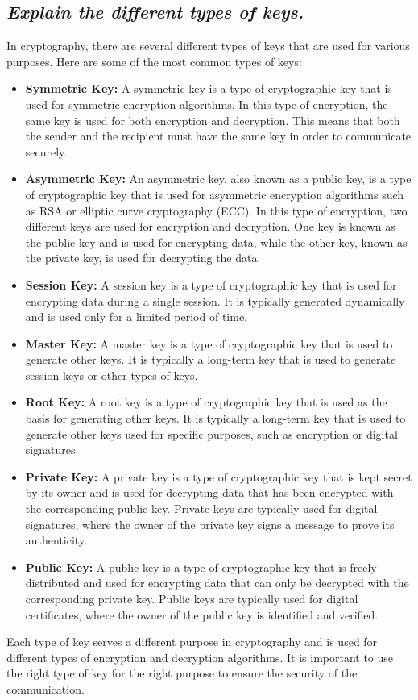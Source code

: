\documentclass{article}
\begin{document}
\subsection{\textit{Explain the different types of keys.}}
In cryptography, there are several different types of keys that are used for various purposes. Here are some of the most common types of keys:
\begin{itemize}
    \item \textbf{Symmetric Key:} A symmetric key is a type of cryptographic key that is used for symmetric encryption algorithms. In this type of encryption, the same key is used for both encryption and decryption. This means that both the sender and the recipient must have the same key in order to communicate securely.
    \item \textbf{Asymmetric Key:} An asymmetric key, also known as a public key, is a type of cryptographic key that is used for asymmetric encryption algorithms such as RSA or elliptic curve cryptography (ECC). In this type of encryption, two different keys are used for encryption and decryption. One key is known as the public key and is used for encrypting data, while the other key, known as the private key, is used for decrypting the data.
    \item \textbf{Session Key:} A session key is a type of cryptographic key that is used for encrypting data during a single session. It is typically generated dynamically and is used only for a limited period of time.
    \item \textbf{Master Key:} A master key is a type of cryptographic key that is used to generate other keys. It is typically a long-term key that is used to generate session keys or other types of keys.
    \item \textbf{Root Key:} A root key is a type of cryptographic key that is used as the basis for generating other keys. It is typically a long-term key that is used to generate other keys used for specific purposes, such as encryption or digital signatures.
    \item \textbf{Private Key:} A private key is a type of cryptographic key that is kept secret by its owner and is used for decrypting data that has been encrypted with the corresponding public key. Private keys are typically used for digital signatures, where the owner of the private key signs a message to prove its authenticity.
    \item \textbf{Public Key:} A public key is a type of cryptographic key that is freely distributed and used for encrypting data that can only be decrypted with the corresponding private key. Public keys are typically used for digital certificates, where the owner of the public key is identified and verified.
\end{itemize}
Each type of key serves a different purpose in cryptography and is used for different types of encryption and decryption algorithms. It is important to use the right type of key for the right purpose to ensure the security of the communication.
\end{document}
